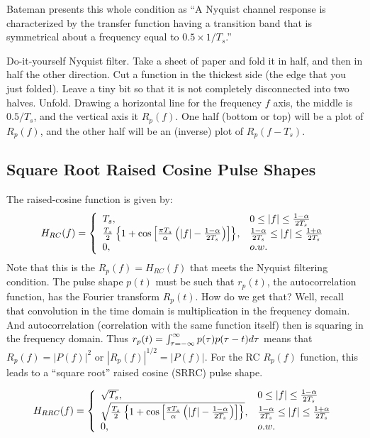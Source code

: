 Bateman presents this whole condition as ``A Nyquist channel
response is characterized by the transfer function having a
transition band that is symmetrical about a frequency equal to $0.5
\times 1/T_{s}$.''

\vspace{0.1in}   Do-it-yourself Nyquist filter.  Take a sheet of paper and fold it in half, and then in half the other direction.  Cut a function in the thickest side (the edge that you just folded).  Leave a tiny bit so that it is not completely disconnected into two halves.  Unfold.  Drawing a horizontal line for the frequency $f$  axis, the middle is $0.5/T_s$, and the vertical axis it $R_p(f)$. One half (bottom or top) will be a plot of $R_p(f)$, and the other half will be an (inverse) plot of $R_p(f-T_s)$.


\subsection{Square Root Raised Cosine Pulse Shapes}

The raised-cosine function is given by:
\begin{equation} \label{E:RC}
H_{RC}(f) = { \left\{\begin{array}{ll} {T_{s}}, & {0 \le |f| \le
\frac{1-\alpha}{2T_{s}}} \\ {\frac{T_{s}}{2}\left\{ 1 + \cos \left[
                      \frac{\pi T_{s}}{\alpha} \left( |f| - \frac{1-\alpha}{2T_{s}}
                       \right)\right]\right\}}, & { \frac{1-\alpha}{2T_{s}} \le |f| \le
                       \frac{1+\alpha}{2T_{s}}} \\ 0, & o.w. \end{array}\right. }
\end{equation}
Note that this is the $R_p(f)= H_{RC}(f)$ that meets the Nyquist filtering condition.  The pulse shape $p(t)$ must be such that $r_p(t)$, the autocorrelation function, has the Fourier transform $R_p(t)$.  How do we get that?  Well, recall that convolution in the time domain is multiplication in the frequency domain.  And autocorrelation (correlation with the same function itself) then is squaring in the frequency domain.  Thus $r_p(t) = {\int_{\tau = -\infty}^{\infty} p(\tau)p(\tau-t) d{\tau} }$ means that $R_p(f) = |P(f)|^2$ or $|R_p(f)|^{1/2} = |P(f)|$.  For the RC $R_p(f)$ function, this leads to a ``square root'' raised cosine (SRRC) pulse shape.

\begin{equation} \label{E:SRRC}
H_{RRC}(f) = { \left\{\begin{array}{ll} {\sqrt{T_{s}}}, & {0 \le |f| \le
\frac{1-\alpha}{2T_{s}}} \\ {\sqrt{\frac{T_{s}}{2}\left\{ 1 + \cos \left[
                      \frac{\pi T_{s}}{\alpha} \left( |f| - \frac{1-\alpha}{2T_{s}}
                       \right)\right]\right\}}}, & { \frac{1-\alpha}{2T_{s}} \le |f| \le
                       \frac{1+\alpha}{2T_{s}}} \\ 0, & o.w. \end{array}\right. }
\end{equation}


